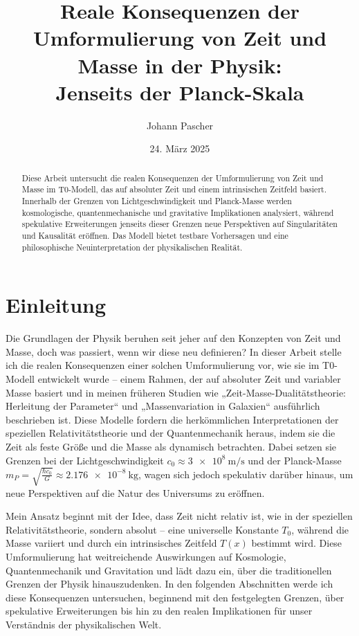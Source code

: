 \documentclass[a4paper,12pt]{article}
\title{Reale Konsequenzen der Umformulierung von Zeit und Masse in der Physik: \\Jenseits der Planck-Skala}
\author{Johann Pascher}
\date{24. März 2025}
\newcommand{\Tfield}{T(x)}
\begin{document}
	
	\maketitle
	
	\begin{abstract}
		Diese Arbeit untersucht die realen Konsequenzen der Umformulierung von Zeit und Masse im T0-Modell, das auf absoluter Zeit und einem intrinsischen Zeitfeld basiert. Innerhalb der Grenzen von Lichtgeschwindigkeit und Planck-Masse werden kosmologische, quantenmechanische und gravitative Implikationen analysiert, während spekulative Erweiterungen jenseits dieser Grenzen neue Perspektiven auf Singularitäten und Kausalität eröffnen. Das Modell bietet testbare Vorhersagen und eine philosophische Neuinterpretation der physikalischen Realität.
	\end{abstract}
	
	\tableofcontents
	\newpage
	
	\section{Einleitung}
	
	Die Grundlagen der Physik beruhen seit jeher auf den Konzepten von Zeit und Masse, doch was passiert, wenn wir diese neu definieren? In dieser Arbeit stelle ich die realen Konsequenzen einer solchen Umformulierung vor, wie sie im T0-Modell entwickelt wurde – einem Rahmen, der auf absoluter Zeit und variabler Masse basiert und in meinen früheren Studien wie „Zeit-Masse-Dualitätstheorie: Herleitung der Parameter“ \cite{pascher_params_2025} und „Massenvariation in Galaxien“ \cite{pascher_galaxies_2025} ausführlich beschrieben ist. Diese Modelle fordern die herkömmlichen Interpretationen der speziellen Relativitätstheorie und der Quantenmechanik heraus, indem sie die Zeit als feste Größe und die Masse als dynamisch betrachten. Dabei setzen sie Grenzen bei der Lichtgeschwindigkeit \(c_0 \approx \SI{3e8}{\meter\per\second}\) und der Planck-Masse \(m_P = \sqrt{\frac{\hbar c_0}{G}} \approx \SI{2.176e-8}{\kilo\gram}\), wagen sich jedoch spekulativ darüber hinaus, um neue Perspektiven auf die Natur des Universums zu eröffnen.
	
	Mein Ansatz beginnt mit der Idee, dass Zeit nicht relativ ist, wie in der speziellen Relativitätstheorie, sondern absolut – eine universelle Konstante \(T_0\), während die Masse variiert und durch ein intrinsisches Zeitfeld \(\Tfield\) bestimmt wird. Diese Umformulierung hat weitreichende Auswirkungen auf Kosmologie, Quantenmechanik und Gravitation und lädt dazu ein, über die traditionellen Grenzen der Physik hinauszudenken. In den folgenden Abschnitten werde ich diese Konsequenzen untersuchen, beginnend mit den festgelegten Grenzen, über spekulative Erweiterungen bis hin zu den realen Implikationen für unser Verständnis der physikalischen Welt.
	
\end{document}
